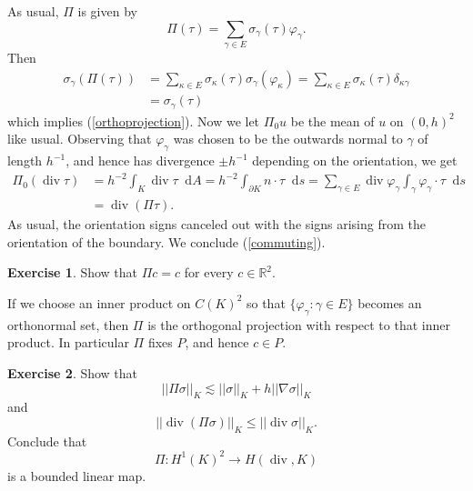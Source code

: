 \documentclass[10pt]{article}
\newcommand{\RR}{\mathbb{R}}
\newcommand*\dif{\mathop{}\!\mathrm{d}}
\DeclareMathOperator{\Div}{div}
\theoremstyle{definition}
\newtheorem{exer}{Exercise}
\begin{document}
    As usual, $\Pi$ is given by 
    $$\Pi(\tau) = \sum_{\gamma \in E} \sigma_\gamma(\tau) \varphi_\gamma.$$
    Then 
\begin{align*}
    \sigma_\gamma(\Pi(\tau)) &= \sum_{\kappa \in E} \sigma_\kappa(\tau) \sigma_\gamma(\varphi_\kappa) = \sum_{\kappa \in E} \sigma_\kappa(\tau) \delta_{\kappa \gamma} \\
    &= \sigma_\gamma(\tau)
\end{align*}
    which implies (\ref{orthoprojection}). Now we let $\Pi_0 u$ be the mean of $u$ on $(0, h)^2$ like usual.
    Observing that $\varphi_\gamma$ was chosen to be the outwards normal to $\gamma$ of length $h^{-1}$, and hence has divergence $\pm h^{-1}$ depending on the orientation, we get 
\begin{align*}
    \Pi_0(\Div \tau) &= h^{-2} \int_K \Div \tau \dif A = h^{-2} \int_{\partial K} n \cdot \tau \dif s = \sum_{\gamma \in E} \Div \varphi_\gamma \int_\gamma \varphi_\gamma \cdot \tau \dif s \\
    &= \Div(\Pi \tau).
\end{align*}
    As usual, the orientation signs canceled out with the signs arising from the orientation of the boundary. We conclude (\ref{commuting}).

\begin{exer}
    Show that $\Pi c = c$ for every $c \in \RR^2$.
\end{exer}

    If we choose an inner product on $C(K)^2$ so that $\{\varphi_\gamma: \gamma \in E\}$ becomes an orthonormal set, then $\Pi$ is the orthogonal projection with respect to that inner product.
    In particular $\Pi$ fixes $P$, and hence $c \in P$.

\begin{exer}
    Show that 
\begin{equation}\label{L2 estimate}
    ||\Pi \sigma||_K \lesssim ||\sigma||_K + h ||\nabla \sigma||_K
\end{equation}
    and 
    $$||\Div(\Pi \sigma)||_K \leq ||\Div \sigma||_K.$$
    Conclude that 
    $$\Pi: H^1(K)^2 \to H(\Div, K)$$
    is a bounded linear map.
\end{exer}
\end{document}
